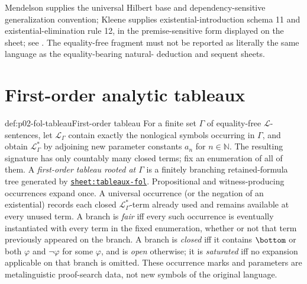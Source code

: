 Mendelson supplies the universal Hilbert base and dependency-sensitive
generalization convention; Kleene supplies existential-introduction schema 11
and existential-elimination rule 12, in the premise-sensitive form displayed
on the sheet; see \cite{Mendelson1997,Kleene1952,Enderton2001}.  The
equality-free fragment must not be
reported as literally the same language as the equality-bearing natural-
deduction and sequent sheets.

\section{First-order analytic tableaux}
\label{sec:p02-tableaux-fol}

\begin{hbdefinition}{def:p02-fol-tableau}{First-order tableau}
For a finite set \(\Gamma\) of equality-free \(\mathcal L\)-sentences, let
\(\mathcal L_{\Gamma}\) contain exactly the nonlogical symbols occurring in
\(\Gamma\), and obtain \(\mathcal L_{\Gamma}^*\) by adjoining new parameter
constants \(a_n\) for \(n\in\mathbb N\).  The resulting signature has only
countably many closed terms; fix an enumeration of all of them.  A
\emph{first-order tableau rooted at \(\Gamma\)}
is a finitely branching
retained-formula tree generated by
\hyperref[sheet:tableaux-fol]{\texttt{sheet:tableaux-fol}}.  Propositional
and witness-producing occurrences expand once.  A universal occurrence (or
the negation of an existential) records each closed
\(\mathcal L_{\Gamma}^*\)-term already used and remains available at every
unused term.  A branch is \emph{fair} iff every such occurrence is eventually
instantiated with every term in the fixed enumeration, whether or not that
term previously appeared on the branch.  A branch is \emph{closed} iff it
contains \(\bottom\) or
both \(\varphi\) and \(\neg\varphi\) for some \(\varphi\), and is \emph{open}
otherwise; it is \emph{saturated} iff no expansion applicable on that branch
is omitted.  These occurrence marks and parameters are
metalinguistic proof-search data, not new symbols of the original language.
\end{hbdefinition}

